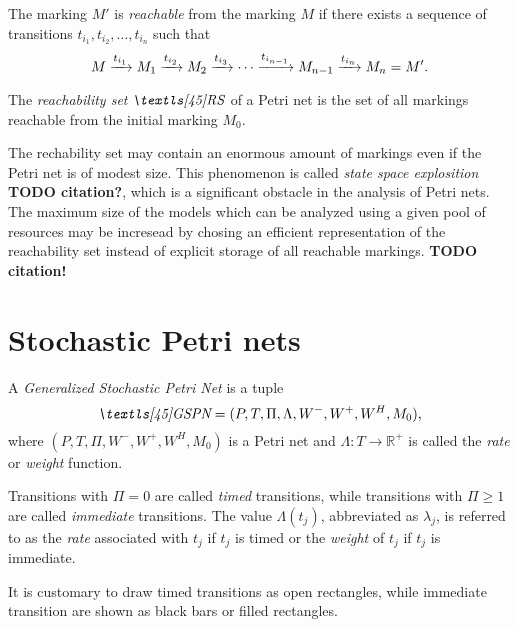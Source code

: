 \begin{dfn}
  The marking $M'$ is \emph{reachable} from the marking $M$ if there
  exists a  sequence of transitions
  $t_{i_1}, t_{i_2}, \ldots, t_{i_n}$ such that
  \begin{equation}
    M \xrightarrow{t_{i_1}} M_1 \xrightarrow{t_{i_2}} M_2
    \xrightarrow{t_{i_3}} \cdots \xrightarrow{t_{i_{n - 1}}} M_{n - 1}
    \xrightarrow{t_{i_n}} M_n = M'\text.
  \end{equation}
\end{dfn}

\begin{dfn}
  The \emph{reachability set} $\RS$ of a Petri net is the set of all
  markings reachable from the initial marking $M_0$.
\end{dfn}

The rechability set may contain an enormous amount of markings even if
the Petri net is of modest size. This phenomenon is called \emph{state
  space explosition} \textbf{TODO citation?}, which is a significant
obstacle in the analysis of Petri nets. The maximum size of the models
which can be analyzed using a given pool of resources may be incresead
by chosing an efficient representation of the reachability set instead
of explicit storage of all reachable markings. \textbf{TODO citation!}

\section{Stochastic Petri nets}

\begin{dfn}
  A \emph{Generalized Stochastic Petri Net} \paren{\emph{\gspn}} is a
  tuple
  \begin{equation}
    \GSPN = (P, T, \Pi, \Lambda, W^-, W^+, W^H, M_0) \text,
  \end{equation}
  where $(P, T, \Pi, W^-, W^+, W^H, M_0)$ is a Petri net and $\Lambda:
  T \to \mathbb{R}^{+}$ is called the \emph{rate} or \emph{weight}
  function.
\end{dfn}

Transitions with $\Pi = 0$ are called \emph{timed} transitions, while
transitions with $\Pi \ge 1$ are called \emph{immediate}
transitions. The value $\Lambda(t_j)$, abbreviated as $\lambda_j$, is
referred to as the \emph{rate} associated with $t_j$ if $t_j$ is
timed or the \emph{weight} of $t_j$ if $t_j$ is immediate.

It is customary to draw timed transitions as open rectangles, while
immediate transition are shown as black bars or filled rectangles.

